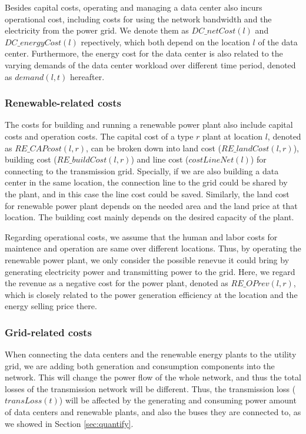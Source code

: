 Besides capital costs, operating and managing a data center also incurs operational cost, including costs for using the network bandwidth and the electricity from the power grid. We denote them as $DC\_netCost(l)$ and $DC\_energyCost(l)$ repectively, which both depend on the location $l$ of the data center. Furthermore, the energy cost for the data center is also related to the varying demands of the data center workload over different time period, denoted as $demand(l,t)$ hereafter.

\subsubsection{Renewable-related costs} The costs for building and running a renewable power plant also include capital costs and operation costs. The capital cost of a type $r$ plant at location $l$, denoted as $RE\_CAPcost(l,r)$, can be broken down into land cost ($RE\_landCost(l,r)$), building cost ($RE\_buildCost(l,r)$) and line cost ($costLineNet(l)$) for connecting to the transmission grid. Specially, if we are also building a data center in the same location, the connection line to the grid could be shared by the plant, and in this case the line cost could be saved. Similarly, the land cost for renewable power plant depends on the needed area and the land price at that location. The building cost mainly depends on the desired capacity of the plant.

Regarding operational costs, we assume that the human and labor costs for maintence and operation are same over different locations. Thus, by operating the renewable power plant, we only consider the possible renevue it could bring by generating electricity power and transmitting power to the grid. Here, we regard the revenue as a negative cost for the power plant, denoted as $RE\_OPrev(l,r)$, which is closely related to the power generation efficiency at the location and the energy selling price there.

\subsubsection{Grid-related costs} When connecting the data centers and the renewable energy plants to the utility grid, we are adding both generation and consumption components into the network. This will change the power flow of the whole network, and thus the total losses of the transmission network will be different. Thus, the transmission loss ($transLoss(t)$) will be affected by the generating and consuming power amount of data centers and renewable plants, and also the buses they are connected to, as we showed in Section \ref{sec:quantify}. 

